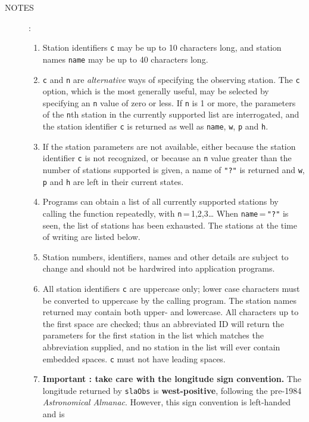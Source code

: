 \documentclass[11pt,fleqn,twoside]{article}
\renewcommand{\_}{{\tt\char'137}}     %
\newlength{\oldspacing}
\newcommand{\notes}[1]
{
  \goodbreak
  \setlength{\oldspacing}{\topsep}
  \setlength{\topsep}{0.3ex}
  \begin{description}
    \item[NOTES]:
        #1
  \end{description}
  \setlength{\topsep}{\oldspacing}
}
\newcommand{\cstring}[1]{\mbox{{\tt "#1"}}}
\begin{document}
\notes
{
 \begin{enumerate}
  \item Station identifiers {\tt c} may be up to 10 characters long,
        and station names {\tt name} may be up to 40 characters long.
  \item {\tt c} and {\tt n} are
        {\it alternative}\/ ways of specifying the observing
        station.  The {\tt c} option, which is the most generally useful,
        may be selected by specifying an {\tt n} value of zero or less.
        If {\tt n} is 1 or more,
        the parameters of the {\tt n}th station
        in the currently supported list are interrogated, and
        the station identifier {\tt c}
        is returned as well as {\tt name}, {\tt w},
        {\tt p} and {\tt h}.
  \item If the station parameters are not available, either because
        the station identifier {\tt c} is not recognized, or because an
        {\tt n} value greater than the number of stations supported is
        given, a name of \cstring{?} is returned
        and {\tt w}, {\tt p} and {\tt h} are left in
        their current states.
  \item Programs can obtain a list of all currently supported
        stations by calling the function repeatedly, with
        {\tt n}\,=\,1,2,3\ldots
        When {\tt name}\,=\,\cstring{?}
        is seen, the list of stations has been
        exhausted.  The stations at the time of writing are listed
        below.
  \item Station numbers, identifiers, names and other details are
        subject to change and should not be hardwired into
        application programs.
  \item All station identifiers {\tt c} are uppercase only;  lower case
        characters must be converted to uppercase by the calling
        program.  The station names returned may contain both upper-
        and lowercase.  All characters up to the first space are
        checked;  thus an abbreviated ID will return the parameters
        for the first station in the list which matches the
        abbreviation supplied, and no station in the list will ever
        contain embedded spaces.  {\tt c} must not have leading spaces.
  \item {\bf Important : take care with the longitude sign convention.}
        The longitude returned by {\tt slaObs} is
        {\bf west-positive}, following the pre-1984 {\it Astronomical
        Almanac}.  However, this sign convention is left-handed and is

\end{enumerate}}
\end{document}
